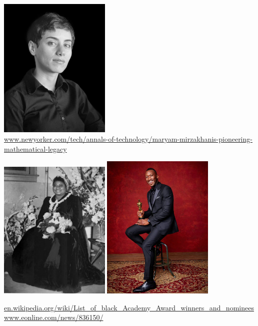 \documentclass{beamer}
\begin{document}
\begin{frame}
    \begin{center}
    \includegraphics[width=0.4\textwidth]{static/maryam.jpg} \\
    \vspace{.8cm}
    \tiny{\url{www.newyorker.com/tech/annals-of-technology/maryam-mirzakhanis-pioneering-mathematical-legacy}}

    \end{center}
\end{frame}

\begin{frame}
    \begin{center}
    \includegraphics[width=0.40\textwidth]{static/hattie.jpg} \hspace{10pt}
    \includegraphics[width=0.40\textwidth, height=.505\textwidth]{static/ali.jpg}
    \vspace{.8cm}

    \tiny{\url{en.wikipedia.org/wiki/List_of_black_Academy_Award_winners_and_nominees}
    \url{www.eonline.com/news/836150/}}

    \end{center}
\end{frame}
\end{document}
